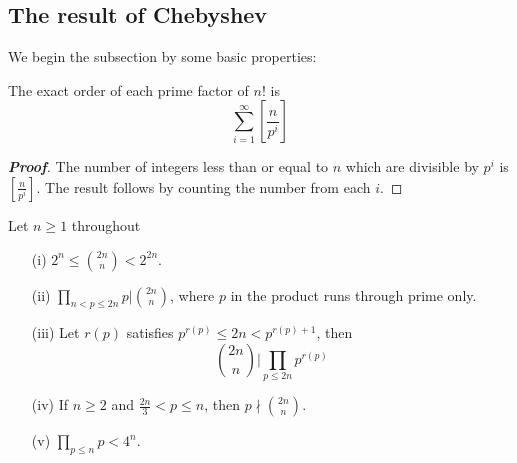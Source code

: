 \subsection{The result of Chebyshev}
We begin the subsection by some basic properties:
\begin{lemma} The exact order of each prime factor of $n!$ is
$$\sum_{i=1}^{\infty} \left[\frac{n}{p^i}\right]$$
\end{lemma}
\begin{proof}[\bf Proof] The number of integers less than or equal to $n$ which are divisible by $p^i$
is $[\frac{n}{p^i}]$. The result follows by counting the number from each $i$.
\end{proof}
\begin{lemma} Let $n \ge 1$ throughout
\begin{enumerate}
\item[(i)] $2^n \le \binom{2n}{n} <2^{2n}$.
\item[(ii)]$\prod_{n<p \le 2n}p \big| \binom{2n}{n}$, where $p$ in the product runs through prime only.
\item[(iii)] Let $r(p)$ satisfies $p^{r(p)} \le 2n <p^{r(p)+1}$, then
$$\binom{2n}{n} \big| \prod_{p \le 2n}p^{r(p)}$$
\item[(iv)] If $n \ge 2$ and $\frac{2n}{3} < p \le n$, then $p \nmid \binom{2n}{n}$.
\item[(v)] $\prod_{p \le n}p < 4^n$.
\end{enumerate}
\end{lemma}
